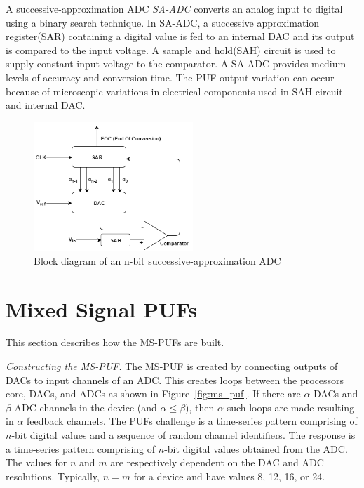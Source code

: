 A successive-approximation ADC {\em SA-ADC} converts an analog
input to digital using a binary search technique.
In SA-ADC, a successive approximation register(SAR) containing 
a digital value is fed to an internal DAC and its output is 
compared to the input voltage. A sample and hold(SAH) circuit 
is used to supply constant input voltage to the comparator. 
A SA-ADC provides medium levels of accuracy and conversion time. 
The PUF output variation can occur because of microscopic variations 
in electrical components used in SAH circuit and internal DAC.
\begin{figure}[h]
\includegraphics[width=6cm]{SA-ADC.png}
\centering
\caption{Block diagram of an n-bit successive-approximation ADC}
\end{figure}


\section{Mixed Signal PUFs}
This section describes how the MS-PUFs are built.

{\flushleft \em Constructing the MS-PUF. }
The MS-PUF is created by connecting outputs of DACs to 
input channels of an ADC. This creates loops between the processors
core, DACs, and ADCs as shown in Figure~\ref{fig:ms_puf}.
If there are $\alpha$ DACs and $\beta$ ADC channels in the device
(and $\alpha \le \beta$), then $\alpha$ such loops are made resulting 
in $\alpha$ feedback channels.
The PUFs challenge is a time-series pattern comprising of
$n$-bit digital values and a sequence of random channel identifiers.
The response is a time-series pattern comprising of $n$-bit digital 
values obtained from the ADC. The values for $n$ and $m$ are
respectively dependent on the DAC and ADC resolutions. Typically, $n = m$
for a device and have values 8, 12, 16, or 24.

